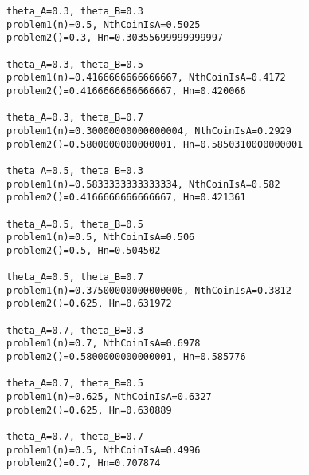 \documentclass[a4paper, 10pt, dvipdfmx]{jlreq}
\begin{document}


\begin{lstlisting}[caption=result, label=code:result]
theta_A=0.3, theta_B=0.3
problem1(n)=0.5, NthCoinIsA=0.5025
problem2()=0.3, Hn=0.30355699999999997

theta_A=0.3, theta_B=0.5
problem1(n)=0.4166666666666667, NthCoinIsA=0.4172
problem2()=0.4166666666666667, Hn=0.420066

theta_A=0.3, theta_B=0.7
problem1(n)=0.30000000000000004, NthCoinIsA=0.2929
problem2()=0.5800000000000001, Hn=0.5850310000000001

theta_A=0.5, theta_B=0.3
problem1(n)=0.5833333333333334, NthCoinIsA=0.582
problem2()=0.4166666666666667, Hn=0.421361

theta_A=0.5, theta_B=0.5
problem1(n)=0.5, NthCoinIsA=0.506
problem2()=0.5, Hn=0.504502

theta_A=0.5, theta_B=0.7
problem1(n)=0.37500000000000006, NthCoinIsA=0.3812
problem2()=0.625, Hn=0.631972

theta_A=0.7, theta_B=0.3
problem1(n)=0.7, NthCoinIsA=0.6978
problem2()=0.5800000000000001, Hn=0.585776

theta_A=0.7, theta_B=0.5
problem1(n)=0.625, NthCoinIsA=0.6327
problem2()=0.625, Hn=0.630889

theta_A=0.7, theta_B=0.7
problem1(n)=0.5, NthCoinIsA=0.4996
problem2()=0.7, Hn=0.707874
\end{lstlisting}
\end{document}
